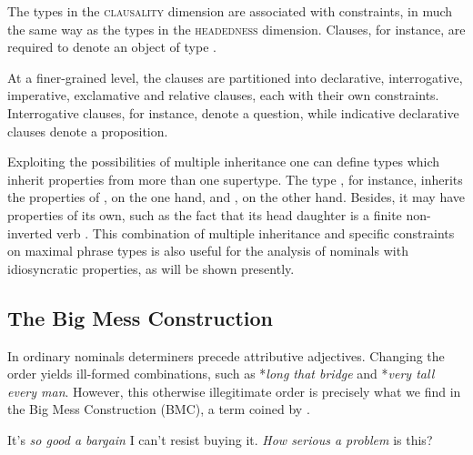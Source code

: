 \documentclass[output=paper
                ,modfonts
                ,nonflat
	        ,collection
	        ,collectionchapter
	        ,collectiontoclongg
 	        ,biblatex
                ,babelshorthands
                ,newtxmath
                ,draftmode
                ,colorlinks, citecolor=brown
]{./langsci/langscibook}
\begin{document}
The types in the \textsc{clausality} dimension are associated with constraints,
in much the same way as the types in the \textsc{headedness} dimension.  
Clauses, for instance, are required to denote an object of type  
\citep[41]{GS00}.

\begin{exe}
\ex 
\begin{avm} 
\end{avm}
\end{exe}

\noindent
At a finer-grained level, the clauses are partitioned into 
declarative, interrogative, imperative, exclamative and relative
clauses, each with their own constraints. 
Interrogative clauses, for instance, denote a question, 
while indicative declarative clauses denote a proposition.

Exploiting the possibilities of multiple inheritance one can 
define types which inherit properties from more than one supertype. 
The type , for instance, inherits 
the properties of , on the one hand, and 
, on the other hand. Besides, it may 
have properties of its own, such as the fact that its head daughter 
is a finite non-inverted verb \citep[43]{GS00}. 
This combination of multiple inheritance and specific   
constraints on maximal phrase types is also useful for the analysis of 
nominals with idiosyncratic properties, as will be shown presently. 


\subsection{The Big Mess Construction} 


In ordinary nominals determiners precede attributive adjectives. Changing the order 
yields ill-formed combinations, such as *\emph{long that bridge} and *\emph{very tall every man}. 
However, this otherwise illegitimate order is precisely what we find in 
the Big Mess Construction (BMC), a term coined by \citet{Berman74}.  

\begin{exe}
\ex\label{bime}
\begin{xlist}
\ex   It's \emph{so good a bargain} I can't resist buying it.
\ex   \emph{How serious a problem} is this?
\end{xlist}
\end{exe} 
\end{document}
